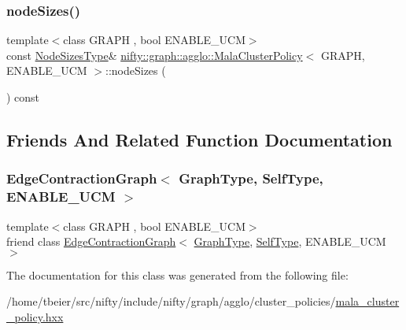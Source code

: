 \subsubsection{\texorpdfstring{node\+Sizes()}{nodeSizes()}}
{\footnotesize\ttfamily template$<$class G\+R\+A\+PH , bool E\+N\+A\+B\+L\+E\+\_\+\+U\+CM$>$ \\
const \hyperlink{classnifty_1_1graph_1_1agglo_1_1MalaClusterPolicy_a559774b548ec31fb481a848a12a45abe}{Node\+Sizes\+Type}\& \hyperlink{classnifty_1_1graph_1_1agglo_1_1MalaClusterPolicy}{nifty\+::graph\+::agglo\+::\+Mala\+Cluster\+Policy}$<$ G\+R\+A\+PH, E\+N\+A\+B\+L\+E\+\_\+\+U\+CM $>$\+::node\+Sizes (\begin{DoxyParamCaption}{ }\end{DoxyParamCaption}) const\hspace{0.3cm}{\ttfamily [inline]}}



\subsection{Friends And Related Function Documentation}
\mbox{\label{classnifty_1_1graph_1_1agglo_1_1MalaClusterPolicy_a6939aa4c6113ba9c44fd5e048687ba92}} 
\subsubsection{\texorpdfstring{Edge\+Contraction\+Graph$<$ Graph\+Type, Self\+Type, E\+N\+A\+B\+L\+E\+\_\+\+U\+C\+M $>$}{EdgeContractionGraph< GraphType, SelfType, ENABLE\_UCM >}}
{\footnotesize\ttfamily template$<$class G\+R\+A\+PH , bool E\+N\+A\+B\+L\+E\+\_\+\+U\+CM$>$ \\
friend class \hyperlink{classnifty_1_1graph_1_1EdgeContractionGraph}{Edge\+Contraction\+Graph}$<$ \hyperlink{classnifty_1_1graph_1_1agglo_1_1MalaClusterPolicy_ae2696b85f3f04787282e003bead20a5d}{Graph\+Type}, \hyperlink{classnifty_1_1graph_1_1agglo_1_1MalaClusterPolicy}{Self\+Type}, E\+N\+A\+B\+L\+E\+\_\+\+U\+CM $>$\hspace{0.3cm}{\ttfamily [friend]}}



The documentation for this class was generated from the following file\+:\begin{DoxyCompactItemize}
\item 
/home/tbeier/src/nifty/include/nifty/graph/agglo/cluster\+\_\+policies/\hyperlink{mala__cluster__policy_8hxx}{mala\+\_\+cluster\+\_\+policy.\+hxx}\end{DoxyCompactItemize}
